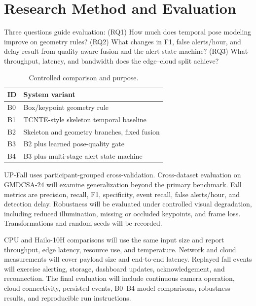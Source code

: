 \section{Research Method and Evaluation}

Three questions guide evaluation: (RQ1) How much does temporal pose modeling improve on geometry rules? (RQ2) What changes in F1, false alerts/hour, and delay result from quality-aware fusion and the alert state machine? (RQ3) What throughput, latency, and bandwidth does the edge--cloud split achieve?

\begin{table}[H]
\caption{Controlled comparison and purpose.}
\label{tab:ablation}
\centering
\footnotesize
\begin{tabularx}{\columnwidth}{@{}p{}X@{}}
\toprule
ID & System variant \\
\midrule
B0 & Box/keypoint geometry rule \\
B1 & TCNTE-style skeleton temporal baseline \\
B2 & Skeleton and geometry branches, fixed fusion \\
B3 & B2 plus learned pose-quality gate \\
B4 & B3 plus multi-stage alert state machine \\
\bottomrule
\end{tabularx}
\end{table}

UP-Fall uses participant-grouped cross-validation. Cross-dataset evaluation on GMDCSA-24 will examine generalization beyond the primary benchmark. Fall metrics are precision, recall, F1, specificity, event recall, false alerts/hour, and detection delay. Robustness will be evaluated under controlled visual degradation, including reduced illumination, missing or occluded keypoints, and frame loss. Transformations and random seeds will be recorded.

CPU and Hailo-10H comparisons will use the same input size and report throughput, edge latency, resource use, and temperature. Network and cloud measurements will cover payload size and end-to-end latency. Replayed fall events will exercise alerting, storage, dashboard updates, acknowledgement, and reconnection. The final evaluation will include continuous camera operation, cloud connectivity, persisted events, B0--B4 model comparisons, robustness results, and reproducible run instructions.
